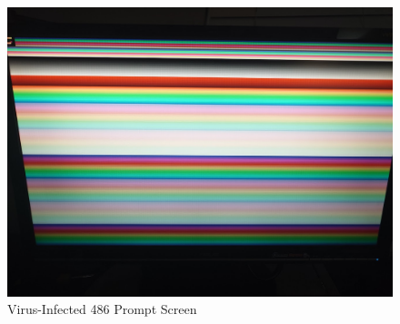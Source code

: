\documentclass{article}
\begin{document}
    \begin{figure}[H]
        \centering
        \includegraphics[width=\textwidth]{packard-prompt} %
        \caption{Virus-Infected 486 Prompt Screen}
        \label{fig:5}
    \end{figure}
\end{document}
